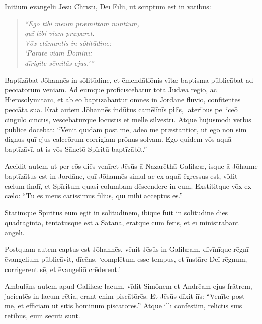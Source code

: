 
\Caput
\Versus Initium ēvangeliī Jēsū Chrīstī, Deī Fīliī,
\Versus ut scrīptum est in vātibus:

\begin{verse}
\begin{patverse*}
\emph{``Ego tibi meum præmittam nūntium,\\
quī tibi viam præparet.\\
\Versus Vōx clāmantis in sōlitūdine:\\
`Parāte viam Dominī;\\
dīrigite sēmitās ejus.'\thinspace''}
\end{patverse*}
\end{verse}

\Versus Baptīzābat Jōhannēs in sōlitūdine, et ēmendātiōnis vītæ baptisma pūblicābat ad peccātōrum veniam.
\Versus Ad eumque proficīscēbātur tōta Jūdæa regiō, ac Hierosolymītānī, et ab eō baptīzābantur omnēs in Jordāne fluviō, cōnfitentēs peccāta sua.
\Versus Erat autem Jōhannēs indūtus camēlīnīs pilīs, lateribus pelliceō cingulō cīnctīs, vescēbāturque locustīs et melle silvestrī.
\Versus Atque hujusmodī verbīs pūblicē docēbat: ``Venit quīdam post mē, adeō mē præstantior, ut ego nōn sim dignus quī ejus calceōrum corrigiam prōnus solvam.
\Versus Ego quidem vōs aquā baptīzāvī, at is vōs Sānctō Spīritū baptīzābit.''

\Versus Accidit autem ut per eōs diēs venīret Jēsūs ā Nazarēthā Galilææ, isque ā Jōhanne baptīzātus est in Jordāne,
\Versus quī Jōhannēs simul ac ex aquā ēgressus est, vīdit cælum findī, et Spīritum quasi columbam dēscendere in eum.
\Versus Exstititque vōx ex cælō: ``Tū es meus cārissimus fīlius, quī mihi acceptus es.''

\Versus Statimque Spīritus eum ēgit in sōlitūdinem,
\Versus ibique fuit in sōlitūdine diēs quadrā\-gintā, tentātusque est ā Satanā, eratque cum ferīs, et eī ministrābant angelī.

\Versus Postquam autem captus est Jōhannēs, vēnit Jēsūs in Galilæam, dīvīnīque rēgnī ēvangelium pūblicāvit,
\Versus dīcēns, `complētum esse tempus, et īnstāre Deī rēgnum, corrigerent sē, et ēvangeliō crēderent.'

\Versus Ambulāns autem apud Galilææ lacum, vīdit Simōnem et Andrēam ejus frātrem, jacientēs in lacum rētia, erant enim piscātōrēs.
\Versus Et Jēsūs dīxit iīs: ``Venīte post mē, et efficiam ut sītis hominum piscātōrēs.''
\Versus Atque illī cōnfestim, relictīs suīs rētibus, eum secūtī sunt.

